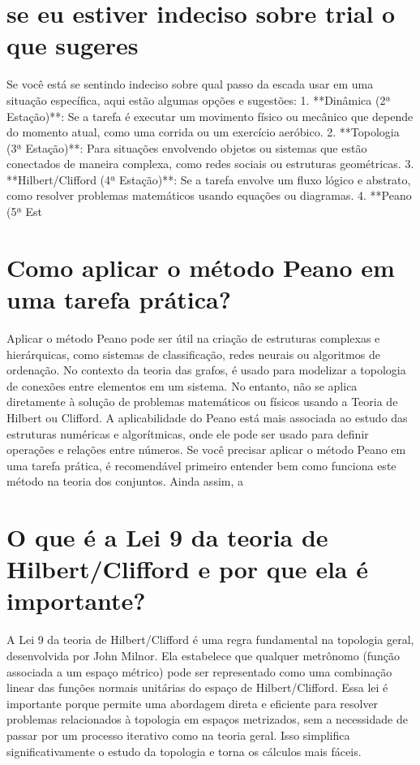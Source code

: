 \documentclass[11pt,a4paper]{article}
\begin{document}
\section{se eu estiver indeciso sobre trial o que sugeres}
Se você está se sentindo indeciso sobre qual passo da escada usar em uma situação específica, aqui estão algumas opções e sugestões: 1. **Dinâmica (2ª Estação)**: Se a tarefa é executar um movimento físico ou mecânico que depende do momento atual, como uma corrida ou um exercício aeróbico. 2. **Topologia (3ª Estação)**: Para situações envolvendo objetos ou sistemas que estão conectados de maneira complexa, como redes sociais ou estruturas geométricas. 3. **Hilbert/Clifford (4ª Estação)**: Se a tarefa envolve um fluxo lógico e abstrato, como resolver problemas matemáticos usando equações ou diagramas. 4. **Peano (5ª Est

\section{Como aplicar o método Peano em uma tarefa prática?}
Aplicar o método Peano pode ser útil na criação de estruturas complexas e hierárquicas, como sistemas de classificação, redes neurais ou algoritmos de ordenação. No contexto da teoria das grafos, é usado para modelizar a topologia de conexões entre elementos em um sistema. No entanto, não se aplica diretamente à solução de problemas matemáticos ou físicos usando a Teoria de Hilbert ou Clifford. A aplicabilidade do Peano está mais associada ao estudo das estruturas numéricas e algorítmicas, onde ele pode ser usado para definir operações e relações entre números. Se você precisar aplicar o método Peano em uma tarefa prática, é recomendável primeiro entender bem como funciona este método na teoria dos conjuntos. Ainda assim, a

\section{O que é a Lei 9 da teoria de Hilbert/Clifford e por que ela é importante?}
A Lei 9 da teoria de Hilbert/Clifford é uma regra fundamental na topologia geral, desenvolvida por John Milnor. Ela estabelece que qualquer metrônomo (função associada a um espaço métrico) pode ser representado como uma combinação linear das funções normais unitárias do espaço de Hilbert/Clifford. Essa lei é importante porque permite uma abordagem direta e eficiente para resolver problemas relacionados à topologia em espaços metrizados, sem a necessidade de passar por um processo iterativo como na teoria geral. Isso simplifica significativamente o estudo da topologia e torna os cálculos mais fáceis.
\end{document}
